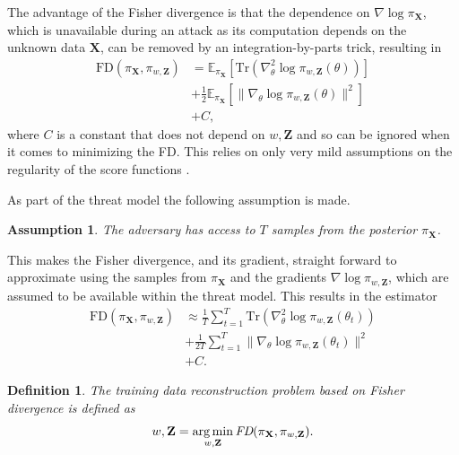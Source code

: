 \documentclass[hyperref]{article}
\theoremstyle{plain}
\newtheorem{definition}[theorem]{Definition}
\newtheorem{assumption}[theorem]{Assumption}
\theoremstyle{remark}
\newcommand{\bX}{\mathbf{X}}
\newcommand{\bZ}{\mathbf{Z}}
\newcommand{\bbE}{\mathbb{E}}
\DeclareMathOperator*{\argmin}{arg\,min}
\begin{document}
The advantage of the Fisher divergence is that the dependence on $\nabla\log\pi_{\bX}$, which is unavailable during an attack as its computation depends on the unknown data $\bX$, can be removed by an integration-by-parts trick, resulting in 
\begin{align}\label{eq:FD_IBP}
	\text{FD}(\pi_{\bX},\pi_{w,\bZ}) & = \bbE_{\pi_{\bX}}[\text{Tr}(\nabla_{\theta}^{2}\log\pi_{w,\bZ}(\theta))] \nonumber\\
	& + \frac{1}{2}\bbE_{\pi_{\bX}}[\lVert \nabla_{\theta}\log\pi_{w,\bZ}(\theta)\rVert^{2}] \\
	& + C,\nonumber
\end{align}
where $C$ is a constant that does not depend on $w,\bZ$ and so can be ignored when it comes to minimizing the FD. This relies on only very mild assumptions on the regularity of the score functions \citep{hyvarinen2005}.

As part of the threat model the following assumption is made.

\begin{assumption}\label{ass:bayes}
	The adversary has access to $T$ samples from the posterior $\pi_{\bX}$.
\end{assumption}

This makes the Fisher divergence, and its gradient, straight forward to approximate using the samples from $\pi_{\bX}$ and the gradients $\nabla\log\pi_{w,\bZ}$, which are assumed to be available within the threat model. This results in the estimator
\begin{align*}
	\text{FD}(\pi_{\bX},\pi_{w,\bZ})& \approx \frac{1}{T}\sum_{t=1}^{T}\text{Tr}(\nabla_{\theta}^{2}\log\pi_{w,\bZ}(\theta_{t})) \\
	& + \frac{1}{2T}\sum_{t=1}^{T}\lVert \nabla_{\theta}\log\pi_{w,\bZ}(\theta_{t})\rVert^{2} \\
	& + C.
\end{align*}


\begin{definition}\label{def:Bayes_reco}
	The training data reconstruction problem based on Fisher divergence is defined as
	\begin{align*}
		w,\bZ = \argmin_{w,\bZ}\emph{FD}(\pi_{\bX},\pi_{w,\bZ}).
	\end{align*}
\end{definition}
\end{document}
